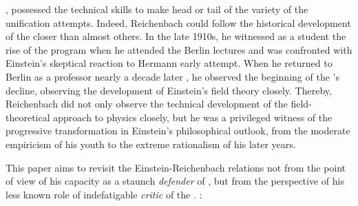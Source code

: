\documentclass[draft]{article}
\newcommand{\FP}{\german{Fernparallelismus}\xspace}
\begin{document}
%


, possessed the technical skills to make head or tail of the variety of the unification attempts. Indeed, Reichenbach could follow the historical development of the \uftp closer than almost others. In the late 1910s, he witnessed as a student the rise of the program when he attended the Berlin lectures and was confronted with Einstein's skeptical reaction to Hermann  early attempt. When he returned to Berlin as a professor nearly a decade later , he observed the beginning of the \uftp's decline, observing the development of Einstein's \FP field theory closely. Thereby, Reichenbach did not only observe the technical development of the field-theoretical approach to physics closely, but he was a privileged witness of the progressive transformation in Einstein's philosophical outlook, from the moderate empiricism of his youth to the extreme rationalism of his later years.


This paper aims to revisit the Einstein-Reichenbach relations not from the point of view of his capacity as a staunch \emph{defender} of \rt \cite{Hentschel1982}, but from the perspective of his less known role of indefatigable \emph{critic} of the \uftp. :
\end{document}
